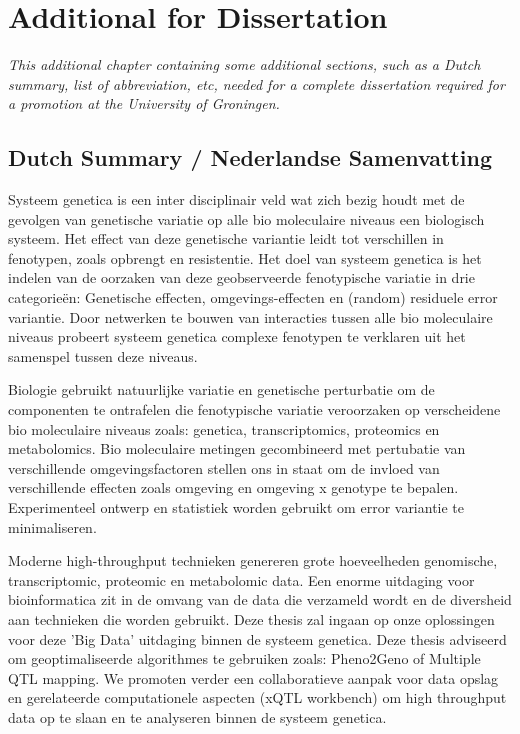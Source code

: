 \chapter{Additional for Dissertation}
\thispagestyle{empty}
\emph{This additional chapter containing some additional sections, such as a Dutch summary, 
list of abbreviation, etc, needed for a complete dissertation required for a promotion at 
the University of Groningen.}
\null
\vfill
\newpage

\section{Dutch Summary / Nederlandse Samenvatting}
Systeem genetica is een inter disciplinair veld wat zich bezig houdt met de gevolgen van 
genetische variatie op alle bio moleculaire niveaus een biologisch systeem. Het effect van 
deze genetische variantie leidt tot verschillen in fenotypen, zoals opbrengt en resistentie. 
Het doel van systeem genetica is het indelen van de oorzaken van deze geobserveerde 
fenotypische variatie in drie categorie\"en: Genetische effecten, omgevings-effecten en 
(random) residuele error variantie. Door netwerken te bouwen van interacties tussen 
alle bio moleculaire niveaus probeert systeem genetica complexe fenotypen te verklaren uit 
het samenspel tussen deze niveaus.

Biologie gebruikt natuurlijke variatie en genetische perturbatie om de componenten te ontrafelen
die fenotypische variatie veroorzaken op verscheidene bio moleculaire niveaus zoals: genetica, 
transcriptomics, proteomics en metabolomics. Bio moleculaire metingen gecombineerd met pertubatie 
van verschillende omgevingsfactoren stellen ons in staat om de invloed van verschillende 
effecten zoals omgeving en omgeving x genotype te bepalen. Experimenteel ontwerp en statistiek 
worden gebruikt om error variantie te minimaliseren.

Moderne high-throughput technieken genereren grote hoeveelheden genomische, transcriptomic, proteomic 
en metabolomic data. Een enorme uitdaging voor bioinformatica zit in de omvang van de data die verzameld 
wordt en de diversheid aan technieken die worden gebruikt. Deze thesis zal ingaan op onze oplossingen 
voor deze 'Big Data' uitdaging binnen de systeem genetica. Deze thesis adviseerd om geoptimaliseerde 
algorithmes te gebruiken zoals: Pheno2Geno of Multiple QTL mapping. We promoten verder een collaboratieve 
aanpak voor data opslag en gerelateerde computationele aspecten (xQTL workbench) om high throughput data 
op te slaan en te analyseren binnen de systeem genetica.


